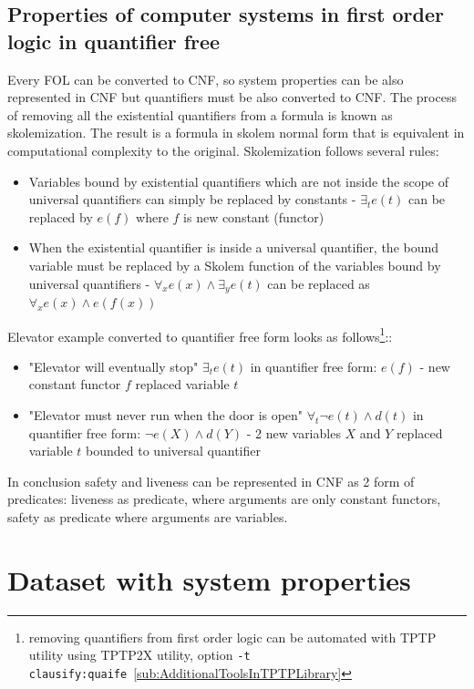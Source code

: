 \subsection{Properties of computer systems in first order logic in quantifier free}

Every \gls{FOL} can be converted to \gls{CNF}, so system properties can be also represented in \gls{CNF} but quantifiers must be also converted to CNF. The process of removing all the existential quantifiers from a formula is known as skolemization. The result is a formula in skolem normal form that is equivalent in computational complexity to the original. Skolemization follows several rules:


\begin{itemize}
  \item Variables bound by existential quantifiers which are not inside the scope of universal quantifiers can simply be replaced by constants - $\exists_t e(t)$ can be replaced by $e(f)$ where $f$ is new constant (functor)
  \item When the existential quantifier is inside a universal quantifier, the bound variable must be replaced by a Skolem function of the variables bound by universal quantifiers - $\forall_x  e(x) \land \exists_y e(t)$ can be replaced as $\forall_x e(x) \land e(f(x))$ 
\end{itemize}


Elevator example converted to quantifier free form looks as follows\footnote{removing quantifiers from first order logic can be automated with TPTP utility using TPTP2X utility, option \texttt{-t clausify:quaife}~\ref{sub:AdditionalToolsInTPTPLibrary} }::
\begin{itemize}
  \item "Elevator will eventually stop" $\exists_t e(t)$ in quantifier free form: $e(f)$ - new constant functor $f$ replaced variable $t$
  \item "Elevator must never run when the door is open" $\forall_t \neg e(t) \land d(t)$ in quantifier free form: $\neg e(X) \land d(Y)$ - 2 new variables $X$ and $Y$ replaced variable $t$ bounded to universal quantifier
\end{itemize}

In conclusion safety and liveness can be represented in CNF as 2 form of predicates: liveness as predicate, where arguments are only constant functors, safety as predicate where arguments are variables.

\section{Dataset with system properties}

